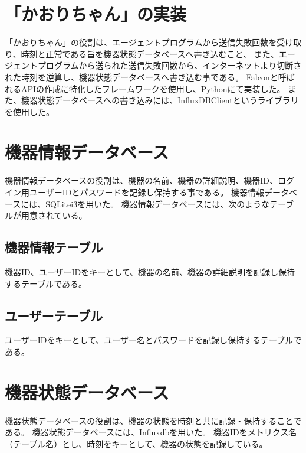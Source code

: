 \section{「かおりちゃん」の実装}
「かおりちゃん」の役割は、エージェントプログラムから送信失敗回数を受け取り、時刻と正常である旨を機器状態データベースへ書き込むこと、
また、エージェントプログラムから送られた送信失敗回数から、インターネットより切断された時刻を逆算し、機器状態データベースへ書き込む事である。
Falconと呼ばれるAPIの作成に特化したフレームワークを使用し、Pythonにて実装した。
また、機器状態データベースへの書き込みには、InfluxDBClientというライブラリを使用した。

\section{機器情報データベース}
機器情報データベースの役割は、機器の名前、機器の詳細説明、機器ID、ログイン用ユーザーIDとパスワードを記録し保持する事である。
機器情報データベースには、SQLitei3を用いた。
機器情報データベースには、次のようなテーブルが用意されている。
\subsection{機器情報テーブル}
機器ID、ユーザーIDをキーとして、機器の名前、機器の詳細説明を記録し保持するテーブルである。
\subsection{ユーザーテーブル}
ユーザーIDをキーとして、ユーザー名とパスワードを記録し保持するテーブルである。

\section{機器状態データベース}
機器状態データベースの役割は、機器の状態を時刻と共に記録・保持することである。
機器状態データベースには、Influxdbを用いた。
機器IDをメトリクス名（テーブル名）とし、時刻をキーとして、機器の状態を記録している。

